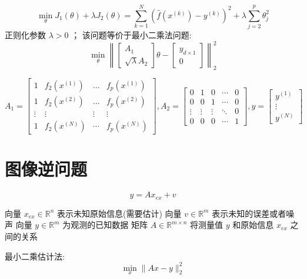 $$
\min _{\theta} J_{1}(\theta)+\lambda J_{2}(\theta)=\sum_{k=1}^{N}\left(\hat{f}\left(x^{(k)}\right)-y^{(k)}\right)^{2}+\lambda \sum_{j=2}^{p} \theta_{j}^{2}
$$
正则化参数 $ \lambda>0 $ ；
该问题等价于最小二乘法问题:
$$
\min _{\theta}\left\|\left[\begin{array}{r}
A_{1} \\
\sqrt{\lambda} A_{2}
\end{array}\right] \theta-\left[\begin{array}{l}
y_{d \times 1} \\
0
\end{array}\right]\right\|_{2}^{2}
$$

$$ A_{1}=\left[\begin{array}{cccc}1 & f_{2}\left(x^{(1)}\right) & \ldots & f_{p}\left(x^{(1)}\right) \\ 1 & f_{2}\left(x^{(2)}\right) & \ldots & f_{p}\left(x^{(2)}\right) \\ \vdots & \vdots & \vdots & \vdots \\ 1 & f_{2}\left(x^{(N)}\right) & \cdots & f_{p}\left(x^{(N)}\right)\end{array}\right],  A_{2}=\left[\begin{array}{ccccc}0 & 1 & 0 & \cdots & 0 \\ 0 & 0 & 1 & \cdots & 0 \\ \vdots & \vdots & \vdots & \ddots & 0 \\ 0 & 0 & 0 & \cdots & 1\end{array}\right], y=\left[\begin{array}{c}y^{(1)} \\ \vdots \\ y^{(N)}\end{array}\right] $$


\section{图像逆问题}

\begin{problem}
    $$ y=A x_{e x}+v $$

向量 $ x_{e x} \in \mathbb{R}^{n} $ 表示未知原始信息(需要估计)
向量 $ v \in \mathbb{R}^{m} $ 表示未知的误差或者噪声
向量 $ y \in \mathbb{R}^{m} $ 为观测的已知数据
矩阵 $ A \in \mathbb{R}^{m \times n} $ 将测量值 $ y $ 和原始信息 $ x_{e x} $ 之间的关系

最小二乘估计法:
$$
\min _{x}\|A x-y\|_{2}^{2}
$$
\end{problem}

